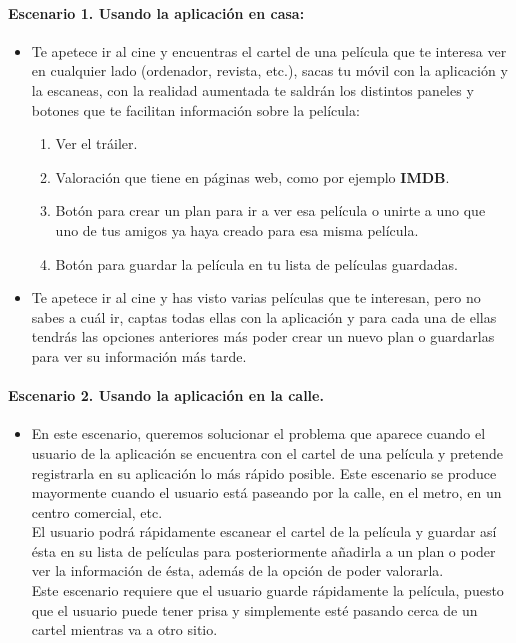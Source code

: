 \paragraph{Escenario 1. Usando la aplicación en casa:\\}
\begin{itemize}
    \item Te apetece ir al cine y encuentras el cartel de una película que te interesa ver en cualquier lado (ordenador, revista, etc.), sacas tu móvil con la aplicación y 
    la escaneas, con la realidad aumentada te saldrán los distintos paneles y botones que te facilitan información sobre la película:
    \begin{enumerate}
        \item Ver el tráiler.
        \item Valoración que tiene en páginas web, como por ejemplo \textbf{IMDB}.
        \item Botón para crear un plan para ir a ver esa película o unirte a uno que uno de tus amigos ya haya creado para esa misma película.
        \item Botón para guardar la película en tu lista de películas guardadas.
    \end{enumerate}
    \item Te apetece ir al cine y has visto varias películas que te interesan, pero no sabes a cuál ir, captas todas ellas con la aplicación 
    y para cada una de ellas tendrás las opciones anteriores más poder crear un nuevo plan o guardarlas para ver su información más tarde.
\end{itemize}
\newpage
\paragraph{Escenario 2. Usando la aplicación en la calle.\\}
\begin{itemize}
\item En este escenario, queremos solucionar el problema que aparece cuando el usuario de la aplicación se encuentra con el cartel de una película y pretende registrarla en su aplicación lo más rápido posible.
Este escenario se produce mayormente cuando el usuario está paseando por la calle, en el metro, en un centro comercial, etc.
\\
El usuario podrá rápidamente escanear el cartel de la película y guardar así ésta en su lista de películas para posteriormente añadirla a un plan o poder ver la información de ésta, además de la opción de poder valorarla.
\\
Este escenario requiere que el usuario guarde rápidamente la película, puesto que el usuario puede tener prisa y simplemente esté pasando cerca de un cartel mientras va a otro sitio.
\end{itemize}



